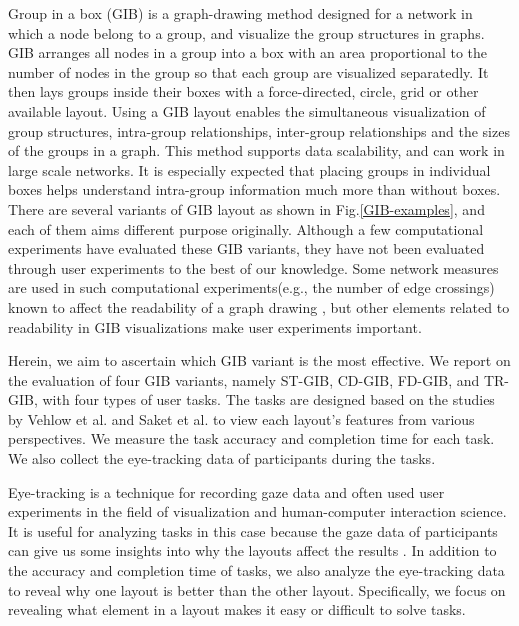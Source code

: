 \documentclass{vgtc}                          %
\begin{document}
Group in a box (GIB) is a graph-drawing method designed for a network in which a node belong to a group, and visualize the group structures in graphs.
GIB arranges all nodes in a group into a box with an area proportional to the number of nodes in the group so that each group are visualized separatedly.
It then lays groups inside their boxes with a force-directed, circle, grid or other available layout.
Using a GIB layout enables the simultaneous visualization of group structures, intra-group relationships, inter-group relationships and the sizes of the groups in a graph.
This method supports data scalability, and can work in large scale networks.
It is especially expected that placing groups in individual boxes helps understand intra-group information much more than without boxes.
There are several variants of GIB layout \cite{rodrigues2011group,chaturvedi2014group,onoue2017optimal} as shown in Fig.\ref{GIB-examples}, and each of them aims different purpose originally.
Although a few computational experiments \cite{chaturvedi2014group,onoue2017optimal} have evaluated these GIB variants, they have not been evaluated through user experiments to the best of our knowledge.
Some network measures are used in such computational experiments(e.g., the number of edge crossings) known to affect the readability of a graph drawing \cite{468391,purchase1997aesthetic,purchase1998performance,purchase2002empirical}, but other elements related to readability in GIB visualizations make user experiments important.

Herein, we aim to ascertain which GIB variant is the most effective.
We report on the evaluation of four GIB variants, namely ST-GIB, CD-GIB, FD-GIB, and TR-GIB, with four types of user tasks. The tasks are designed based on the studies by Vehlow et al.
\cite{Vehlow2017VisualizingGS} and Saket et al. \cite{saket2014group} to view each layout's features from various perspectives.
We measure the task accuracy and completion time for each task.
We also collect the eye-tracking data of participants during the tasks.

Eye-tracking is a technique for recording gaze data and often used user experiments in the field of visualization and human-computer interaction science.
It is useful for analyzing tasks in this case because the gaze data of participants can give us some insights into why the layouts affect the results \cite{andrienko2012visual,duchowski2007eye,kurzhals2014evaluating}.
In addition to the accuracy and completion time of tasks, we also analyze the eye-tracking data to reveal why one layout is better than the other layout.
Specifically, we focus on revealing what element in a layout makes it easy or difficult to solve tasks.
\end{document}

